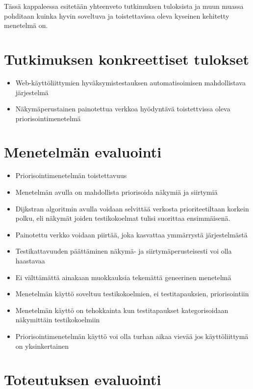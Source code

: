 Tässä kappaleessa esitetään yhteenveto tutkimuksen tuloksista ja muun muassa pohditaan kuinka hyvin soveltuva ja toistettavissa oleva kyseinen kehitetty menetelmä on.

\section{Tutkimuksen konkreettiset tulokset} \label{ch:12_tutkimuksen_konkreettiset_tulokset}

  \begin{itemize}
    \item Web-käyttöliittymien hyväksymistestauksen automatisoimisen mahdollistava järjestelmä
    \item Näkymäperustainen painotettua verkkoa hyödyntävä toistettvissa oleva priorisointimenetelmä
  \end{itemize}

\section{Menetelmän evaluointi} \label{ch:12_menetelman_evaluointi}

  \begin{itemize}
    \item Priorisointimenetelmän toistettavuus
    \item Menetelmän avulla on mahdollista priorisoida näkymiä ja siirtymiä
    \item Dijkstran algoritmin avulla voidaan selvittää verkosta prioriteetiltaan korkein polku, eli näkymät joiden testikokoelmat tulisi suorittaa ensimmäisenä.
    \item Painotettu verkko voidaan piirtää, joka kasvattaa ymmärrystä järjestelmästä
    \item Testikattavuuden päättäminen näkymä- ja siirtymäperusteisesti voi olla haastavaa
    \item Ei välttämättä ainakaan muokkauksia tekemättä geneerinen menetelmä
    \item Menetelmän käyttö soveltuu testikokoelmien, ei testitapauksien, priorisointiin
    \item Menetelmän käyttö on tehokkainta kun testitapaukset kategorisoidaan näkymittäin testikokoelmiin
    \item Priorisointimenetelmän käyttö voi olla turhan aikaa vievää jos käyttöliittymä on yksinkertainen
  \end{itemize}

\section{Toteutuksen evaluointi} \label{ch:12_toteutuksen_evaluointi}

